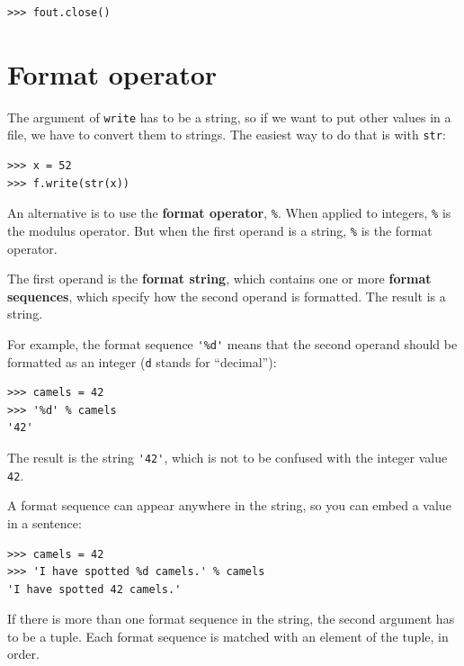 \documentclass[10pt]{book}
\begin{document}
\beforeverb
\begin{verbatim}
>>> fout.close()
\end{verbatim}
\afterverb
%



\section{Format operator}


The argument of {\tt write} has to be a string, so if we want
to put other values in a file, we have to convert them to
strings.  The easiest way to do that is with {\tt str}:

\beforeverb
\begin{verbatim}
>>> x = 52
>>> f.write(str(x))
\end{verbatim}
\afterverb
%
An alternative is to use the {\bf format operator}, {\tt \%}.  When
applied to integers, {\tt \%} is the modulus operator.  But
when the first operand is a string, {\tt \%} is the format operator.


The first operand is the {\bf format string}, which contains
one or more {\bf format sequences}, which
specify how
the second operand is formatted.  The result is a string.


For example, the format sequence \verb"'%d'" means that
the second operand should be formatted as an
integer ({\tt d} stands for ``decimal''):

\beforeverb
\begin{verbatim}
>>> camels = 42
>>> '%d' % camels
'42'
\end{verbatim}
\afterverb
%
The result is the string \verb"'42'", which is not to be confused
with the integer value {\tt 42}.

A format sequence can appear anywhere in the string,
so you can embed a value in a sentence:

\beforeverb
\begin{verbatim}
>>> camels = 42
>>> 'I have spotted %d camels.' % camels
'I have spotted 42 camels.'
\end{verbatim}
\afterverb
%
If there is more than one format sequence in the string,
the second argument has to be a tuple.  Each format sequence is
matched with an element of the tuple, in order.
\end{document}
